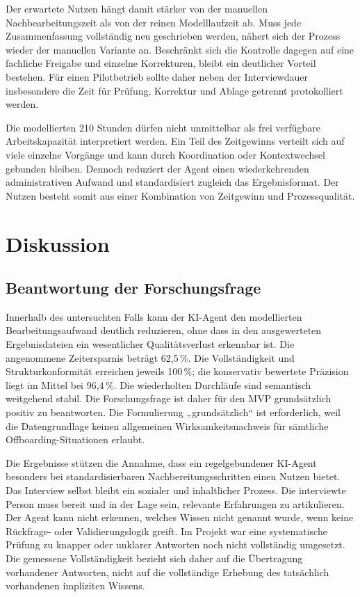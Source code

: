 \documentclass[
  10pt,
  ngerman,
  a4paper,
  toc=graduated,
  numbers=noenddot,
  headings=standardclasses,
  nonumberlist
]{scrartcl}
\newcommand{\pct}[1]{#1\,\%}
\begin{document}
Der erwartete Nutzen hängt damit stärker von der manuellen Nachbearbeitungszeit als von der reinen Modelllaufzeit ab. Muss jede Zusammenfassung vollständig neu geschrieben werden, nähert sich der Prozess wieder der manuellen Variante an. Beschränkt sich die Kontrolle dagegen auf eine fachliche Freigabe und einzelne Korrekturen, bleibt ein deutlicher Vorteil bestehen. Für einen Pilotbetrieb sollte daher neben der Interviewdauer insbesondere die Zeit für Prüfung, Korrektur und Ablage getrennt protokolliert werden.

Die modellierten 210 Stunden dürfen nicht unmittelbar als frei verfügbare Arbeitskapazität interpretiert werden. Ein Teil des Zeitgewinns verteilt sich auf viele einzelne Vorgänge und kann durch Koordination oder Kontextwechsel gebunden bleiben. Dennoch reduziert der Agent einen wiederkehrenden administrativen Aufwand und standardisiert zugleich das Ergebnisformat. Der Nutzen besteht somit aus einer Kombination von Zeitgewinn und Prozessqualität.

\newpage
\section{Diskussion}

\subsection{Beantwortung der Forschungsfrage}

Innerhalb des untersuchten Falls kann der KI-Agent den modellierten Bearbeitungsaufwand deutlich reduzieren, ohne dass in den ausgewerteten Ergebnisdateien ein wesentlicher Qualitätsverlust erkennbar ist. Die angenommene Zeitersparnis beträgt \pct{62{,}5}. Die Vollständigkeit und Strukturkonformität erreichen jeweils \pct{100}; die konservativ bewertete Präzision liegt im Mittel bei \pct{96{,}4}. Die wiederholten Durchläufe sind semantisch weitgehend stabil. Die Forschungsfrage ist daher für den MVP grundsätzlich positiv zu beantworten. Die Formulierung „grundsätzlich“ ist erforderlich, weil die Datengrundlage keinen allgemeinen Wirksamkeitsnachweis für sämtliche Offboarding-Situationen erlaubt.

Die Ergebnisse stützen die Annahme, dass ein regelgebundener KI-Agent besonders bei standardisierbaren Nachbereitungsschritten einen Nutzen bietet. Das Interview selbst bleibt ein sozialer und inhaltlicher Prozess. Die interviewte Person muss bereit und in der Lage sein, relevante Erfahrungen zu artikulieren. Der Agent kann nicht erkennen, welches Wissen nicht genannt wurde, wenn keine Rückfrage- oder Validierungslogik greift. Im Projekt war eine systematische Prüfung zu knapper oder unklarer Antworten noch nicht vollständig umgesetzt. Die gemessene Vollständigkeit bezieht sich daher auf die Übertragung vorhandener Antworten, nicht auf die vollständige Erhebung des tatsächlich vorhandenen impliziten Wissens.
\end{document}
